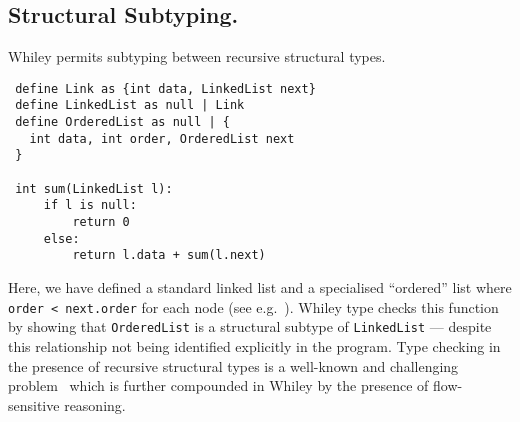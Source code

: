 \subsection{Structural Subtyping.}
Whiley permits subtyping between recursive structural types.
\begin{lstlisting}
 define Link as {int data, LinkedList next}
 define LinkedList as null | Link
 define OrderedList as null | {
   int data, int order, OrderedList next
 }

 int sum(LinkedList l):
     if l is null:
         return 0
     else:
         return l.data + sum(l.next)
\end{lstlisting}
Here, we have defined a standard linked list and a specialised
``ordered'' list where \lstinline{order < next.order} for each node
(see e.g.~\cite{DS87}).  Whiley type checks this function by showing
that \lstinline{OrderedList} is a structural subtype of
\lstinline{LinkedList} --- despite this relationship not being
identified explicitly in the program.  Type checking in the presence
of recursive structural types is a well-known and challenging
problem~\cite{GLP02,CA93,KPS93} which is further compounded in Whiley
by the presence of flow-sensitive reasoning.

